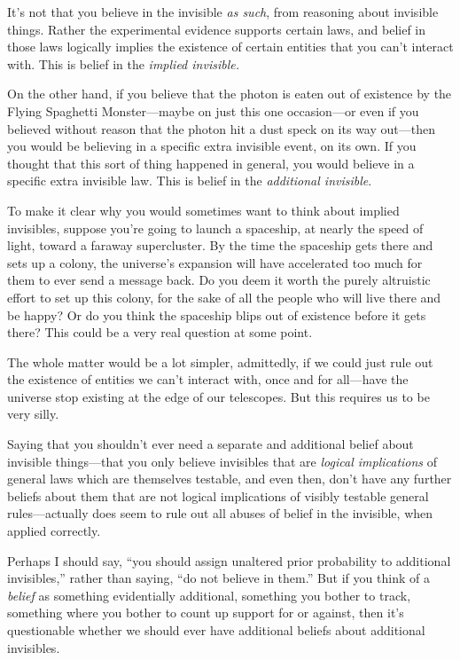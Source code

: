 {
 It's not that you believe in the invisible
\textit{as such}, from reasoning about invisible things. Rather the
experimental evidence supports certain laws, and belief in those laws
logically implies the existence of certain entities that you
can't interact with. This is belief in the
\textit{implied invisible.}}

{
 On the other hand, if you believe that the photon is eaten out of
existence by the Flying Spaghetti Monster---maybe on just this one
occasion---or even if you believed without reason that the photon hit a
dust speck on its way out---then you would be believing in a specific
extra invisible event, on its own. If you thought that this sort of
thing happened in general, you would believe in a specific extra
invisible law. This is belief in the \textit{additional invisible}.}

{
 To make it clear why you would sometimes want to think about
implied invisibles, suppose you're going to launch a
spaceship, at nearly the speed of light, toward a faraway supercluster.
By the time the spaceship gets there and sets up a colony, the
universe's expansion will have accelerated too much for
them to ever send a message back. Do you deem it worth the purely
altruistic effort to set up this colony, for the sake of all the people
who will live there and be happy? Or do you think the spaceship blips
out of existence before it gets there? This could be a very real
question at some point.}

{
 The whole matter would be a lot simpler, admittedly, if we could
just rule out the existence of entities we can't
interact with, once and for all---have the universe stop existing at
the edge of our telescopes. But this requires us to be very silly.}

{
 Saying that you shouldn't ever need a separate and
additional belief about invisible things---that you only believe
invisibles that are \textit{logical implications} of general laws which
are themselves testable, and even then, don't have any
further beliefs about them that are not logical implications of visibly
testable general rules---actually does seem to rule out all abuses of
belief in the invisible, when applied correctly.}

{
 Perhaps I should say, ``you should assign
unaltered prior probability to additional
invisibles,'' rather than saying,
``do not believe in them.'' But if
you think of a \textit{belief} as something evidentially additional,
something you bother to track, something where you bother to count up
support for or against, then it's questionable whether
we should ever have additional beliefs about additional invisibles.}

